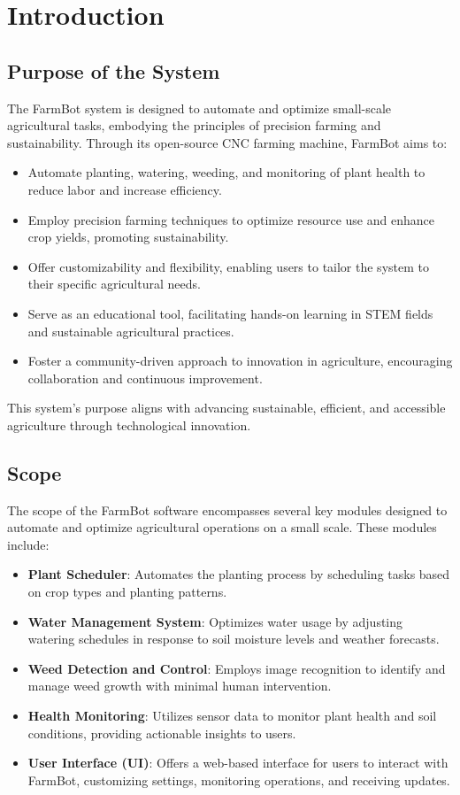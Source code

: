 
\chapter{Introduction} \label{introduction}


\section{Purpose of the System }
The FarmBot system is designed to automate and optimize small-scale agricultural tasks, embodying the principles of precision farming and sustainability. Through its open-source CNC farming machine, FarmBot aims to:
\begin{itemize}
    \item Automate planting, watering, weeding, and monitoring of plant health to reduce labor and increase efficiency.
    \item Employ precision farming techniques to optimize resource use and enhance crop yields, promoting sustainability.
    \item Offer customizability and flexibility, enabling users to tailor the system to their specific agricultural needs.
    \item Serve as an educational tool, facilitating hands-on learning in STEM fields and sustainable agricultural practices.
    \item Foster a community-driven approach to innovation in agriculture, encouraging collaboration and continuous improvement.
\end{itemize}
This system’s purpose aligns with advancing sustainable, efficient, and accessible agriculture through technological innovation.

\section{Scope}

The scope of the FarmBot software encompasses several key modules designed to automate and optimize agricultural operations on a small scale. These modules include:

\begin{itemize}
    \item \textbf{Plant Scheduler}: Automates the planting process by scheduling tasks based on crop types and planting patterns.
    \item \textbf{Water Management System}: Optimizes water usage by adjusting watering schedules in response to soil moisture levels and weather forecasts.
    \item \textbf{Weed Detection and Control}: Employs image recognition to identify and manage weed growth with minimal human intervention.
    \item \textbf{Health Monitoring}: Utilizes sensor data to monitor plant health and soil conditions, providing actionable insights to users.
    \item \textbf{User Interface (UI)}: Offers a web-based interface for users to interact with FarmBot, customizing settings, monitoring operations, and receiving updates.
\end{itemize}

